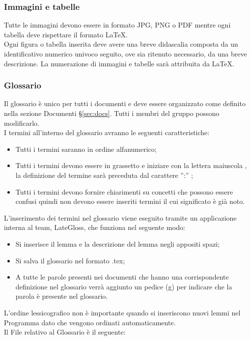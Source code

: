 {{		\subsubsection{Immagini e tabelle}{
			\label{sub:img}
			Tutte le immagini devono essere in formato JPG, PNG o PDF mentre ogni tabella deve rispettare il formato \LaTeX.\\
			Ogni figura o tabella inserita deve avere una breve didascalia composta da un identificativo numerico univoco seguito, ove sia ritenuto necessario, da una breve descrizione. La numerazione di immagini e tabelle sarà attribuita da \LaTeX.\\			
			}
		}
\subsubsection{Glossario}{
 	Il glossario è unico per tutti i documenti e deve essere organizzato come definito nella sezione Documenti \S\ref{sec:docs}. Tutti i membri del gruppo possono modificarlo.\\
 	I termini all'interno del glossario avranno le seguenti caratteristiche:
 	\begin{itemize}
	 	\item Tutti i termini saranno in ordine alfanumerico;
	 	\item Tutti i termini devono essere in grassetto e iniziare con la lettera maiuscola , la definizione del termine sarà preceduta dal carattere '':'' ;
	 	\item Tutti i termini devono fornire chiarimenti su concetti che possono essere confusi quindi non devono essere inseriti termini il cui significato è già noto.
 	\end{itemize}	
      L'inserimento dei termini nel glossario viene eseguito tramite un applicazione interna al team, LateGloss, che funziona nel seguente modo:
      \begin{itemize}
	      \item Si inserisce il lemma e la descrizione del lemma negli appositi spazi;
	      \item Si salva il glossario nel formato .tex;
	      \item A tutte le parole presenti nei documenti che hanno una corrispondente definizione nel glossario  verrà aggiunto un pedice (g) per indicare che la parola è presente nel glossario.
      \end{itemize}  
   L'ordine lessicografico non è importante quando si inseriscono nuovi lemmi nel Programma dato che vengono ordinati automaticamente.\\
   Il File relativo al Glossario è il seguente: \href{run:../../Esterni/\fGlossario}{\fEscapeGlossario}
}
}
